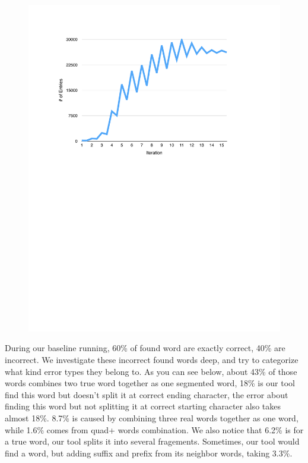 \documentclass[11pt, oneside, fleqn]{article}
\begin{document}
  \begin{figure}[h]
  \includegraphics{./figure/entropy_per_iteration.pdf}
  \end{figure}

  During our baseline running, 60\% of found word are exactly correct, 40\% are incorrect. We investigate these incorrect found words deep, and try to categorize what kind error types they belong to. As you can see below, about 43\% of those words combines two true word together as one segmented word, 18\% is our tool find this word but doesn't split it at correct ending character, the error about finding this word but not splitting it at correct starting character also takes almost 18\%. 8.7\% is caused by combining three real words together as one word, while 1.6\% comes from quad+ words combination. We also notice that 6.2\% is for a true word, our tool splits it into several fragements. Sometimes, our tool would find a word, but adding suffix and prefix from its neighbor words, taking 3.3\%.
\end{document}
